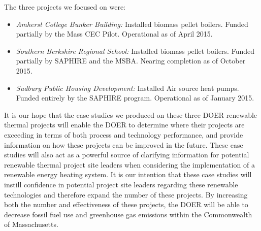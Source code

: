 \noindent
The three projects we focused on were:
\begin{itemize}
  \item{\emph{Amherst College Bunker Building:} Installed biomass pellet boilers. Funded partially by the Mass CEC Pilot. Operational as of April 2015.}
  \item{\emph{Southern Berkshire Regional School:} Installed biomass pellet boilers. Funded partially by SAPHIRE and the MSBA. Nearing completion as of October 2015.}
  \item{\emph{Sudbury Public Housing Development:} Installed Air source heat pumps. Funded entirely by the SAPHIRE program. Operational as of January 2015.}
\end{itemize}
\par It is our hope that the case studies we produced on these three DOER renewable thermal projects will enable the DOER to determine where their projects are exceeding in terms of both process and technology performance, and provide information on how these projects can be improved in the future. These case studies will also act as a powerful source of clarifying information for potential renewable thermal project site leaders when considering the implementation of a renewable energy heating system. It is our intention that these case studies will instill confidence in potential project site leaders regarding these renewable technologies and therefore expand the number of these projects. By increasing both the number and effectiveness of these projects, the DOER will be able to decrease fossil fuel use and greenhouse gas emissions within the Commonwealth of Massachusetts.

